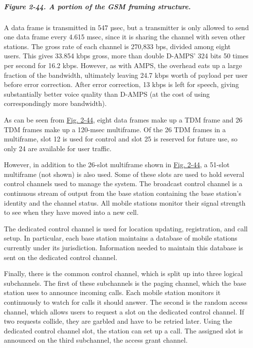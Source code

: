 \subparagraph[Figure 2-44. A portion of the GSM framing
structure.]{\texorpdfstring{\protect\hypertarget{0130661023_ch02lev1sec6.htmlux5cux23ch02fig44}{}{}Figure
2-44. A portion of the GSM framing
structure.}{Figure 2-44. A portion of the GSM framing structure.}}


A data frame is transmitted in 547 µsec, but a transmitter is only
allowed to send one data frame every 4.615 msec, since it is sharing the
channel with seven other stations. The gross rate of each channel is
270,833 bps, divided among eight users. This gives 33.854 kbps gross,
more than double D-AMPS' 324 bits 50 times per second for 16.2 kbps.
However, as with AMPS, the overhead eats up a large fraction of the
bandwidth, ultimately leaving 24.7 kbps worth of payload per user before
error correction. After error correction, 13 kbps is left for speech,
giving substantially better voice quality than D-AMPS (at the cost of
using correspondingly more bandwidth).

As can be seen from
\protect\hyperlink{0130661023_ch02lev1sec6.htmlux5cux23ch02fig44}{Fig.
2-44}, eight data frames make up a TDM frame and 26 TDM frames make up a
120-msec multiframe. Of the 26 TDM frames in a multiframe, slot 12 is
used for control and slot 25 is reserved for future use, so only 24 are
available for user traffic.

However, in addition to the 26-slot multiframe shown in
\protect\hyperlink{0130661023_ch02lev1sec6.htmlux5cux23ch02fig44}{Fig.
2-44}, a 51-slot multiframe (not shown) is also used. Some of these
slots are used to hold several control channels used to manage the
system. The {broadcast control channel} is a continuous stream of output
from the base station containing the base station's identity and the
channel status. All mobile stations monitor their signal strength to see
when they have moved into a new cell.

The {dedicated control channel} is used for location updating,
registration, and call setup. In particular, each base station maintains
a database of mobile stations currently under its jurisdiction.
Information needed to maintain this database is sent on the dedicated
control channel.

Finally, there is the {common control channel}, which is split up into
three logical subchannels. The first of these subchannels is the {paging
channel}, which the base station uses to announce incoming calls. Each
mobile station monitors it continuously to watch for calls it should
answer. The second is the {random access channel}, which allows users to
request a slot on the dedicated control channel. If two requests
collide, they are garbled and have to be retried later. Using the
dedicated control channel slot, the station can set up a call. The
assigned slot is announced on the third subchannel, the {access grant
channel}.

